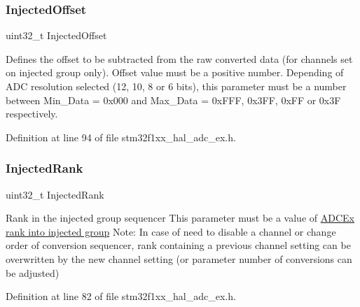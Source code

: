 \mbox{\label{struct_a_d_c___injection_conf_type_def_a23b15894f9d014c9187f4ab6f3eaa8fe}} 
\subsubsection{\texorpdfstring{Injected\+Offset}{InjectedOffset}}
{\footnotesize\ttfamily uint32\+\_\+t Injected\+Offset}

Defines the offset to be subtracted from the raw converted data (for channels set on injected group only). Offset value must be a positive number. Depending of A\+DC resolution selected (12, 10, 8 or 6 bits), this parameter must be a number between Min\+\_\+\+Data = 0x000 and Max\+\_\+\+Data = 0x\+F\+FF, 0x3\+FF, 0x\+FF or 0x3F respectively. 

Definition at line 94 of file stm32f1xx\+\_\+hal\+\_\+adc\+\_\+ex.\+h.

\mbox{\label{struct_a_d_c___injection_conf_type_def_a5cd2664770d0917ae4d70ccc703b54b3}} 
\subsubsection{\texorpdfstring{Injected\+Rank}{InjectedRank}}
{\footnotesize\ttfamily uint32\+\_\+t Injected\+Rank}

Rank in the injected group sequencer This parameter must be a value of \hyperlink{group___a_d_c_ex__injected__rank}{A\+D\+C\+Ex rank into injected group} Note\+: In case of need to disable a channel or change order of conversion sequencer, rank containing a previous channel setting can be overwritten by the new channel setting (or parameter number of conversions can be adjusted) 

Definition at line 82 of file stm32f1xx\+\_\+hal\+\_\+adc\+\_\+ex.\+h.

\mbox{\label{struct_a_d_c___injection_conf_type_def_a1c082ab5a5715594d9387eacbebd99a0}} 
